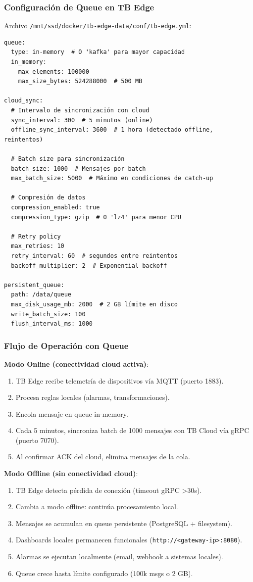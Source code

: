 \subsubsection{Configuración de Queue en TB Edge}

Archivo \texttt{/mnt/ssd/docker/tb-edge-data/conf/tb-edge.yml}:
\begin{verbatim}
queue:
  type: in-memory  # O 'kafka' para mayor capacidad
  in_memory:
    max_elements: 100000
    max_size_bytes: 524288000  # 500 MB
  
cloud_sync:
  # Intervalo de sincronización con cloud
  sync_interval: 300  # 5 minutos (online)
  offline_sync_interval: 3600  # 1 hora (detectado offline, reintentos)
  
  # Batch size para sincronización
  batch_size: 1000  # Mensajes por batch
  max_batch_size: 5000  # Máximo en condiciones de catch-up
  
  # Compresión de datos
  compression_enabled: true
  compression_type: gzip  # O 'lz4' para menor CPU
  
  # Retry policy
  max_retries: 10
  retry_interval: 60  # segundos entre reintentos
  backoff_multiplier: 2  # Exponential backoff

persistent_queue:
  path: /data/queue
  max_disk_usage_mb: 2000  # 2 GB límite en disco
  write_batch_size: 100
  flush_interval_ms: 1000
\end{verbatim}

\subsubsection{Flujo de Operación con Queue}

\textbf{Modo Online (conectividad cloud activa)}:
\begin{enumerate}
    \item TB Edge recibe telemetría de dispositivos vía MQTT (puerto 1883).
    \item Procesa reglas locales (alarmas, transformaciones).
    \item Encola mensaje en queue in-memory.
    \item Cada 5 minutos, sincroniza batch de 1000 mensajes con TB Cloud vía gRPC (puerto 7070).
    \item Al confirmar ACK del cloud, elimina mensajes de la cola.
\end{enumerate}

\textbf{Modo Offline (sin conectividad cloud)}:
\begin{enumerate}
    \item TB Edge detecta pérdida de conexión (timeout gRPC >30s).
    \item Cambia a modo offline: continúa procesamiento local.
    \item Mensajes se acumulan en queue persistente (PostgreSQL + filesystem).
    \item Dashboards locales permanecen funcionales (\texttt{http://<gateway-ip>:8080}).
    \item Alarmas se ejecutan localmente (email, webhook a sistemas locales).
    \item Queue crece hasta límite configurado (100k msgs o 2 GB).
\end{enumerate}

